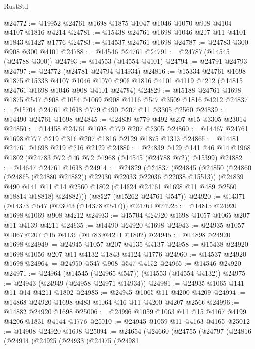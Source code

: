 \begin{lexlean}{RustStd}
\begin{coremodule}
@24772 := @19952 @24761 @1698 @1875 @1047 @1046 @1070 @908 @4104 @4107 @1816 @4214
@24781 := @15438 @24761 @1698 @1046 @207 @11 @4101 @1843 @1427 @1776
@24783 := @14537 @24761 @1698
@24787 := @24783 @300 @908 @300 @4101
@24788 := @14546 @24761
@24791 := @24787 (@14545 (@24788 @300))
@24793 := @14553 (@14554 @4101)
@24794 := @24791 @24793
@24797 := @24772 (@24781 @24794 @14934)
@24816 := @15334
    @24761
    @1698
    @1875
    @15338
    @4107
    @1046
    @1070
    @908
    @1816
    @4101
    @4119
    @4212
    (@14815 @24761 @1698 @1046 @908 @4101 @24794)
@24829 := @15188 @24761 @1698 @1875 @547 @908 @1054 @1069 @908 @4116 @547 @3509 @1816 @4212
@24837 := @15704 @24761 @1698 @779 @490 @207 @11 @3305 @2560
@24839 := @14490 @24761 @1698
@24845 := @24839 @779 @492 @207 @15 @3305 @23014
@24850 := @14458 @24761 @1698 @779 @207 @3305
@24860 := @14467 @24761 @1698 @777 @219 @316 @207 @1816 @2129 @1875 @1313
@24865 := @14481 @24761 @1698 @219 @316 @2129
@24880 := @24839
    @129
    @141
    @46
    @14
    @1968
    @1802
    (@24783 @72 @46 @72 @1968 (@14545 (@24788 @72)) @15399)
@24882 := @14647 @24761 @1698
@24914 := @24829
    (@24837
      (@24845
        (@24850 (@24860 (@24865 (@24880 @24882)) @22030 @22033 @22036 @22038 @15513))
        (@24839
          @490
          @141
          @11
          @14
          @2560
          @1802
          (@14824 @24761 @1698 @11 @489 @2560 @18814 @18818)
          @24882)))
    (@8527 (@15262 @24761 @547))
@24920 := @14371 (@14373 @547 (@23043 (@14378 @547))) @24761
@24925 := @14815 @24920 @1698 @1069 @908 @4212
@24933 := @15704 @24920 @1698 @1057 @1065 @207 @11 @4139 @4211
@24935 := @14490 @24920 @1698
@24943 := @24935 @1057 @1067 @207 @15 @4139 (@1783 @4211 @1802)
@24945 := @14898 @24920 @1698
@24949 := @24945 @1057 @207 @4135 @4137
@24958 := @15438 @24920 @1698 @1056 @207 @11 @4132 @1843 @4124 @1776
@24960 := @14537 @24920 @1698
@24964 := @24960 @547 @908 @547 @4132
@24965 := @14546 @24920
@24971 := @24964 (@14545 (@24965 @547)) (@14553 (@14554 @4132))
@24975 := @24943 (@24949 (@24958 @24971 @14934))
@24981 := @24935 @1065 @141 @11 @14 @4211 @1802
@24985 := @24945 @1065 @11 @4200 @4209
@24994 := @14868 @24920 @1698 @483 @1064 @16 @11 @4200 @4207 @2566
@24996 := @14882 @24920 @1698
@25006 := @24996 @1059 @1063 @11 @15 @4167 @4199 @4206 @1831 @4144 @1776
@25010 := @24945 @1059 @11 @4163 @4165
@25012 := @14908 @24920 @1698
@25094 := @24654
    (@24660
      (@24755
        (@24797
          (@24816
            (@24914
              (@24925
                (@24933
                  (@24975
                    (@24981

\end{coremodule}
\end{lexlean}

